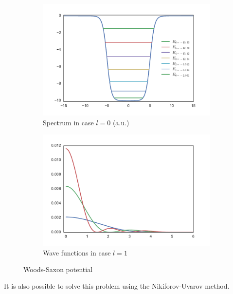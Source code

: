 \documentclass[a4paper, 12pt]{article}
\begin{document}
\begin{figure}[h!]
\centering
\begin{subfigure}{.5\textwidth}
  \centering
  \includegraphics[width=1.0\linewidth]{WS_poten.pdf}
  \caption{Spectrum in case $l=0$ (a.u.)}
  \label{fig1:WS_spc}
\end{subfigure}%
\begin{subfigure}{.5\textwidth}
  \centering
  \includegraphics[width=1.0\linewidth]{WS_wave.pdf}
  \caption{Wave functions in case $l=1$}
  \label{fig:wave_func}
\end{subfigure}
\caption{Woods-Saxon potential}
\label{fig:WS_potential}
\end{figure}

It is also possible  to solve this problem using  the Nikiforov-Uvarov method. 
\end{document}

